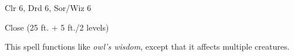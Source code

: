 
\begin{description*}
\item[Level:] Clr 6, Drd 6, Sor/Wiz 6
\item[Range:] Close (25 ft. + 5 ft./2 levels)
\end{description*}

This spell functions like \textit{owl's wisdom}, except that it affects multiple
creatures.